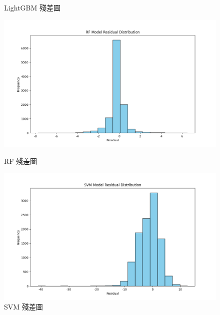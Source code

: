 \documentclass[12pt,a4paper]{article}
\begin{document}
\begin{enumerate}
\begin{enumerate}[label=\arabic*.]
\begin{enumerate}[label=3-2-\arabic*.]
\begin{enumerate}[label=\Alph*.]
\begin{figure}[H]
\begin{minipage}[t]{0.4\textwidth}
                            \caption{LightGBM 殘差圖}
                            \label{fig:residual_lightgbm}
                        \end{minipage}
                        \vspace{0.001\textwidth}
                        \begin{minipage}[t]{0.4\textwidth}
                            \centering
                            \includegraphics[width=\textwidth]{resources/image/ResidualPlot/RF.png}
                            \caption{RF 殘差圖}
                            \label{fig:residual_rf}
                        \end{minipage}
                        \hspace{0.001\textwidth}
                        \begin{minipage}[t]{0.4\textwidth}
                            \centering
                            \includegraphics[width=\textwidth]{resources/image/ResidualPlot/SVM.png}
                            \caption{SVM 殘差圖}
                            \label{fig:residual_svm}

\end{minipage}
\end{figure}
\end{enumerate}
\end{enumerate}
\end{enumerate}
\end{enumerate}
\end{document}
